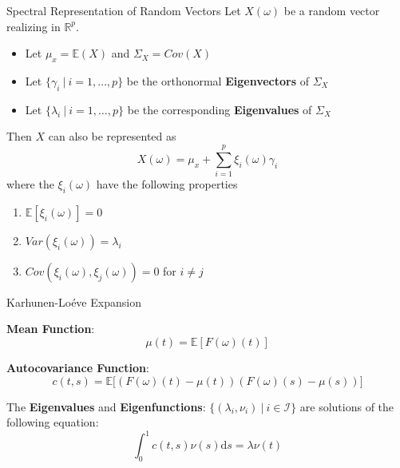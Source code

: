 \documentclass{beamer}
\begin{document}

	\begin{frame}{Spectral Representation of Random Vectors}
		Let $X(\omega)$ be a random vector realizing in $\mathbb{R}^p$.

		\begin{itemize}
			\item Let $\mu_x = \mathbb{E}(X)$ and $\Sigma_X = Cov(X)$
			\item Let $\{\gamma_i \: \vert \: i = 1, \dots, p\}$ be the orthonormal \textbf{Eigenvectors} of $\Sigma_X$
			\item Let $\{\lambda_i \: \vert \: i = 1, \dots, p\}$ be the corresponding \textbf{Eigenvalues} of $\Sigma_X$
		\end{itemize}
	
		\vspace{0.2cm}
		Then $X$ can also be represented as
		$$X(\omega) = \mu_x + \sum_{i = 1}^{p} \xi_i(\omega) \gamma_i$$
		where the $\xi_i(\omega)$ have the following properties
		
		\begin{multicols}{2}
			\begin{enumerate}
				\item $\mathbb{E}[\xi_i(\omega)] = 0$
				\item $Var(\xi_i(\omega)) = \lambda_i$
				\item $Cov(\xi_i(\omega), \xi_j(\omega)) = 0$ for $i \neq j$
			\end{enumerate}
		\end{multicols}
	\end{frame}

	\begin{frame}{Karhunen-Lo\'{e}ve Expansion}
		
		\textbf{Mean Function}: $$\mu(t) = \mathbb{E}\left[ F(\omega)(t) \right]$$

		\textbf{Autocovariance Function}: $$c(t,s) = \mathbb{E}\big[ \left( F(\omega)(t) - \mu(t) \right) \left( F(\omega)(s) - \mu(s) \right) \big]$$
		
		The \textbf{Eigenvalues} and \textbf{Eigenfunctions}: $\{(\lambda_i, \nu_i) \: \vert \: i \in \mathcal{I}\}$  are solutions of the following equation:
		$$ \int_{0}^{1}c(t,s)\nu(s) \mathrm{d}s = \lambda \nu(t) $$
	\end{frame}
	
\end{document}
